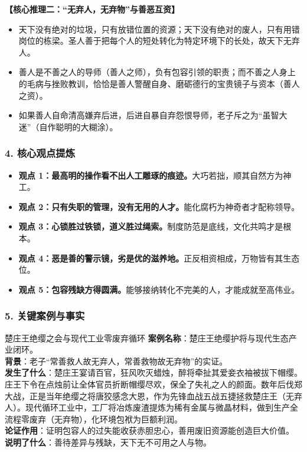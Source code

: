 \noindent\textbf{【核心推理二：“无弃人，无弃物”与善恶互资】}
\begin{itemize}
    \item 天下没有绝对的垃圾，只有放错位置的资源；天下没有绝对的废人，只有用错岗位的栋梁。圣人善于把每个人的短处转化为特定环境下的长处，故天下无弃人。
    \item 善人是不善之人的导师（善人之师），负有包容引领的职责；而不善之人身上的毛病与挫败教训，恰恰是善人警醒自身、磨砺德行的宝贵镜子与资本（善人之资）。
    \item 如果善人自命清高嫌弃后进，后进自暴自弃怨恨导师，老子斥之为“虽智大迷”（自作聪明的大糊涂）。
\end{itemize}

\subsubsection{4. 核心观点提炼}
\begin{itemize}
    \item \textbf{观点 1：最高明的操作看不出人工雕琢的痕迹。}大巧若拙，顺其自然方为神工。
    \item \textbf{观点 2：只有失职的管理，没有无用的人才。}能化腐朽为神奇者才配称领导。
    \item \textbf{观点 3：心锁胜过铁锁，道义胜过绳索。}制度防范是底线，文化共鸣才是根本。
    \item \textbf{观点 4：恶是善的警示镜，劣是优的滋养地。}正反相资相成，万物皆有其生态位。
    \item \textbf{观点 5：包容残缺方得圆满。}能够接纳转化不完美的人，才能成就至高伟业。
\end{itemize}

\subsubsection{5. 关键案例与事实}
\begin{CaseBox}{楚庄王绝缨之会与现代工业零废弃循环}
\textbf{案例名称}：楚庄王绝缨护将与现代生态产业闭环。\\
\textbf{背景}：老子“常善救人故无弃人，常善救物故无弃物”的实证。\\
\textbf{发生了什么}：楚庄王宴请百官，狂风吹灭蜡烛，醉将牵扯其爱妾衣袖被拔下帽缨。庄王下令在点烛前让全体官员折断帽缨尽欢，保全了失礼之人的颜面。数年后伐郑大战，正是当年绝缨之将唐狡感念大恩，作为先锋血战五战五捷拯救楚庄王（无弃人）。现代循环工业中，工厂将冶炼废渣提炼为稀有金属与微晶材料，做到生产全流程零废弃（无弃物），化环境包袱为巨额利润。\\
\textbf{论证作用}：证明包容人的过失能收获赤胆忠心，善用废旧资源能创造巨大价值。\\
\textbf{说明了什么}：善待差异与残缺，天下无不可用之人与物。
\end{CaseBox}

